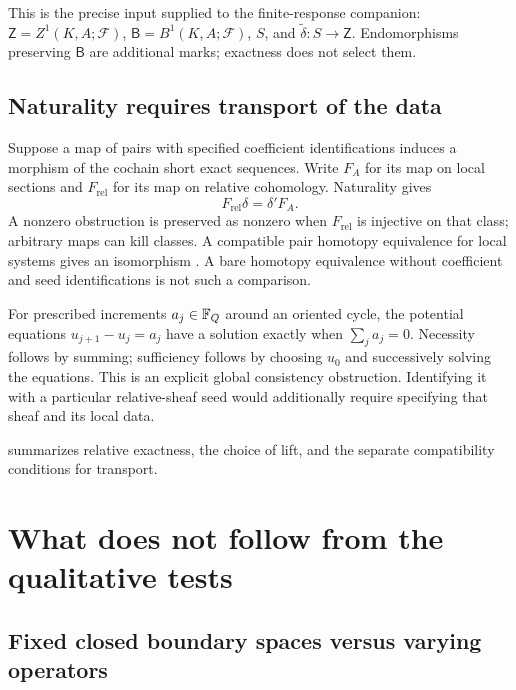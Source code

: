 \documentclass[11pt,a4paper]{article}
\begin{document}
This is the precise input supplied to the finite-response companion:
$\mathsf Z=Z^1(K,A;\mathcal F)$,
$\mathsf B=B^1(K,A;\mathcal F)$, $S$, and
$\widetilde\delta:S\to\mathsf Z$.  Endomorphisms preserving
$\mathsf B$ are additional marks; exactness does not select them.

\subsection{Naturality requires transport of the data}

Suppose a map of pairs with specified coefficient identifications induces
a morphism of the cochain short exact sequences.  Write $F_A$ for its
map on local sections and $F_{\mathrm{rel}}$ for its map on relative
cohomology.  Naturality gives
\[
 F_{\mathrm{rel}}\delta=\delta'F_A.
\]
A nonzero obstruction is preserved as nonzero when
$F_{\mathrm{rel}}$ is injective on that class; arbitrary maps can kill
classes.  A compatible pair homotopy equivalence for local systems gives
an isomorphism \cite[Section 3.H]{hatcher}.  A bare homotopy equivalence
without coefficient and seed identifications is not such a comparison.

\begin{example}\label{ex:additive}
For prescribed increments $a_j\in\mathbb F_Q$ around an oriented cycle, the
potential equations $u_{j+1}-u_j=a_j$ have a solution exactly when
$\sum_j a_j=0$.  Necessity follows by summing; sufficiency follows by
choosing $u_0$ and successively solving the equations.  This is an explicit
global consistency obstruction.  Identifying it with a particular
relative-sheaf seed would additionally require specifying that sheaf and
its local data.
\end{example}

 summarizes relative exactness, the choice
of lift, and the separate compatibility conditions for transport.


\section{What does not follow from the qualitative tests}
\label{sec:limits}

\subsection{Fixed closed boundary spaces versus varying operators}
\end{document}
